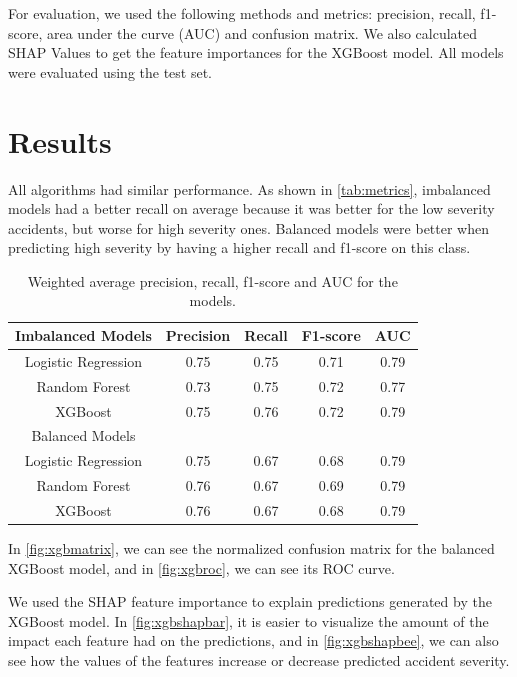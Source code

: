 \documentclass[12pt]{article}
\begin{document}
For evaluation, we used the following methods and metrics: precision, recall, f1-score, area under the curve (AUC) and confusion matrix. We also calculated SHAP Values to get the feature importances for the XGBoost model. All models were evaluated using the test set.

\section{Results}

All algorithms had similar performance. As shown in \autoref{tab:metrics}, imbalanced models had a better recall on average because it was better for the low severity accidents, but worse for high severity ones. Balanced models were better when predicting high severity by having a higher recall and f1-score on this class.

\begin{table}[h]
        \centering
        \begin{tabular}[c]{ c c c c c }
                \toprule
                Imbalanced Models & Precision & Recall & F1-score & AUC \\
                \midrule
                Logistic Regression & 0.75 & 0.75 & 0.71 & 0.79\\
                Random Forest & 0.73 & 0.75 & 0.72 & 0.77 \\
                XGBoost & 0.75 & 0.76 & 0.72 & 0.79 \\
                \midrule
                Balanced Models \\
                \midrule
                Logistic Regression & 0.75 & 0.67 & 0.68 & 0.79 \\
                Random Forest & 0.76 & 0.67 & 0.69 & 0.79 \\
                XGBoost & 0.76 & 0.67 & 0.68 & 0.79 \\
                \bottomrule
        \end{tabular}
        \caption{Weighted average precision, recall, f1-score and AUC for the models.\label{tab:metrics}}
\end{table}

In \autoref{fig:xgbmatrix}, we can see the normalized confusion matrix for the balanced XGBoost model, and in \autoref{fig:xgbroc}, we can see its ROC curve.

We used the SHAP feature importance to explain predictions generated by the XGBoost model. In \autoref{fig:xgbshapbar}, it is easier to visualize the amount of the impact each feature had on the predictions, and in \autoref{fig:xgbshapbee}, we can also see how the values of the features increase or decrease predicted accident severity.
\end{document}
